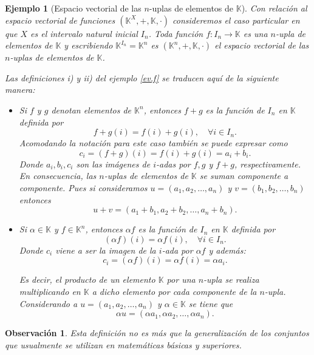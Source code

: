 \documentclass[b5paper, 11pt]{book}
\newcommand{\0}{\mathbf{0}}
\newcommand{\K}{\mathds{K}}
\newtheorem{obs}{Observación}[chapter]
\theoremstyle{estiloB}
\newtheorem{ejemg}{Ejemplo}[chapter]
\theoremstyle{estiloC}
\theoremstyle{estiloD}
\begin{document}
\begin{ejemg}[Espacio vectorial de las $n$-uplas de elementos de $\K$]
Con relación al espacio vectorial de funciones $(\K^{X}, +, \K, \cdot)$ consideremos el caso particular en que $X$ es el intervalo natural inicial $I_{n}$. Toda función $f: I_{n} \to \K$ es una $n$-upla de elementos de $\K$ y escribiendo $\K^{I_n}= \K^{n}$ es $(\K^{n}, +, \K, \cdot)$ el espacio vectorial de las $n$-uplas de elementos de $\K$.

Las definiciones \textit{i)} y \textit{ii)} del ejemplo \ref{ev.f} se traducen aquí de la siguiente manera:

\begin{itemize}
\item[\textit{i)}] Si $f$ y $g$ denotan elementos de $\K^{n}$, entonces $f+g$ es la función de $I_n$ en $\K$ definida por
\[ f+g(i)= f(i)+ g(i), \quad \forall i \in I_n. \]
Acomodando la notación para este caso también se puede expresar como
\[ c_i= (f+g)(i)= f(i)+ g(i)= a_i + b_i. \]
Donde $a_i, b_i, c_i$ son las imágenes de $i$-adas por $f,g$ y $f+g$, respectivamente. En consecuencia, las $n$-uplas de elementos de $\K$ se suman componente a componente. Pues si consideramos $u= (a_1, a_2, \ldots , a_n)$ y $v= (b_1, b_2, \ldots , b_n)$ entonces
\[ u+v= (a_1 + b_1, a_2 + b_2, \ldots , a_n + b_n). \]

\item[\textit{ii)}] Si $\alpha \in \K$ y $f \in \K^{n}$, entonces $\alpha f$ es la función de $I_n$ en $\K$ definida por
\[ (\alpha f)(i)= \alpha f(i), \quad \forall i \in I_n. \]
Donde $c_i$ viene a ser la imagen de la $i$-ada por $\alpha f$ y además:
\[ c_i = (\alpha f)(i)= \alpha f(i)= \alpha a_i. \]

Es decir, el producto de un elemento $\K$ por una $n$-upla se realiza multiplicando en $\K$ a dicho elemento por cada componente de la $n$-upla. Considerando a $u= (a_1, a_2, \ldots , a_n)$ y $\alpha \in \K$ se tiene que
\[ \alpha u= (\alpha a_1,\alpha a_2, \ldots , \alpha a_n). \] 
\end{itemize}
\end{ejemg}

\begin{obs}
Esta definición no es más que la generalización de los conjuntos que usualmente se utilizan en matemáticas básicas y superiores.
\end{obs}
\end{document}
